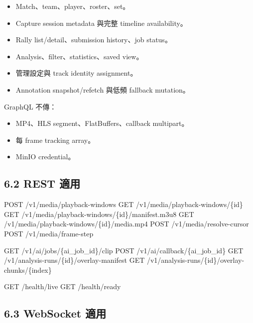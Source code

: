 \documentclass[
  9pt,
  a4paper,
]{article}
\newenvironment{Shaded}{}{}
\newcommand{\NormalTok}[1]{#1}
\providecommand{\tightlist}{%
  \setlength{\itemsep}{0pt}\setlength{\parskip}{0pt}}
\begin{document}
\begin{itemize}
\tightlist
\item
  Match、team、player、roster、set。
\item
  Capture session metadata 與完整 timeline availability。
\item
  Rally list/detail、submission history、job status。
\item
  Analysis、filter、statistics、saved view。
\item
  管理設定與 track identity assignment。
\item
  Annotation snapshot/refetch 與低頻 fallback mutation。
\end{itemize}

GraphQL 不傳：

\begin{itemize}
\tightlist
\item
  MP4、HLS segment、FlatBuffers、callback multipart。
\item
  每 frame tracking array。
\item
  MinIO credential。
\end{itemize}

\subsection{6.2 REST 適用}\label{62-rest-ux9069ux7528}

\begin{Shaded}
\begin{Highlighting}[]
\NormalTok{POST /v1/media/playback{-}windows}
\NormalTok{GET  /v1/media/playback{-}windows/\{id\}}
\NormalTok{GET  /v1/media/playback{-}windows/\{id\}/manifest.m3u8}
\NormalTok{GET  /v1/media/playback{-}windows/\{id\}/media.mp4}
\NormalTok{POST /v1/media/resolve{-}cursor}
\NormalTok{POST /v1/media/frame{-}step}

\NormalTok{GET  /v1/ai/jobs/\{ai\_\allowbreak{}job\_\allowbreak{}id\}/clip}
\NormalTok{POST /v1/ai/callback/\{ai\_\allowbreak{}job\_\allowbreak{}id\}}
\NormalTok{GET  /v1/analysis{-}runs/\{id\}/overlay{-}manifest}
\NormalTok{GET  /v1/analysis{-}runs/\{id\}/overlay{-}chunks/\{index\}}

\NormalTok{GET  /health/live}
\NormalTok{GET  /health/ready}
\end{Highlighting}
\end{Shaded}

\subsection{6.3 WebSocket 適用}\label{63-websocket-ux9069ux7528}
\end{document}
